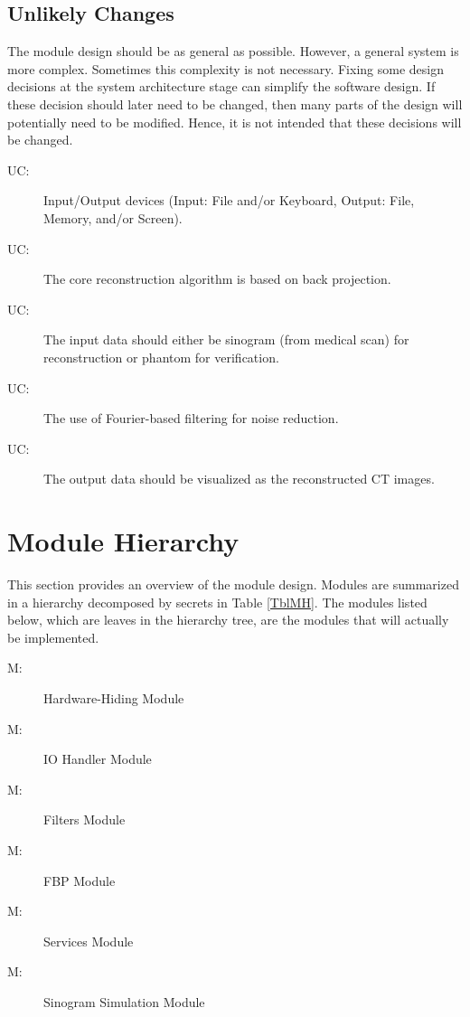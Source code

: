\documentclass[12pt, titlepage]{article}
\newcounter{ucnum}
\newcommand{\uctheucnum}{UC\theucnum}
\newcounter{mnum}
\newcommand{\mthemnum}{M\themnum}
\begin{document}
\subsection{Unlikely Changes} \label{SecUchange}

The module design should be as general as possible. However, a general system is
more complex. Sometimes this complexity is not necessary. Fixing some design
decisions at the system architecture stage can simplify the software design. If
these decision should later need to be changed, then many parts of the design
will potentially need to be modified. Hence, it is not intended that these
decisions will be changed.

\begin{description}
\item[ \uctheucnum \label{ucIO}:] Input/Output devices
  (Input: File and/or Keyboard, Output: File, Memory, and/or Screen).
\item[ \uctheucnum \label{ucI1}:] The core reconstruction
  algorithm is based on back projection.
\item[ \uctheucnum \label{ucI2}:] The input data should
  either be sinogram (from medical scan) for reconstruction or phantom for
  verification.
\item[ \uctheucnum \label{ucI3}:] The use of Fourier-based
  filtering for noise reduction.
\item[ \uctheucnum \label{ucI4}:] The output data should be
  visualized as the reconstructed CT images.
\end{description}

\section{Module Hierarchy} \label{SecMH}

This section provides an overview of the module design. Modules are summarized
in a hierarchy decomposed by secrets in Table \ref{TblMH}. The modules listed
below, which are leaves in the hierarchy tree, are the modules that will
actually be implemented.

\begin{description}
\item [ \mthemnum \label{mHH}:] Hardware-Hiding Module
\item [ \mthemnum \label{mIO}:] IO Handler Module
\item [ \mthemnum \label{mF}:] Filters Module
\item [ \mthemnum \label{mFBP}:] FBP Module
\item [ \mthemnum \label{mCon}:] Services Module
\item [ \mthemnum \label{mS}:] Sinogram Simulation Module
\end{description}
\end{document}
